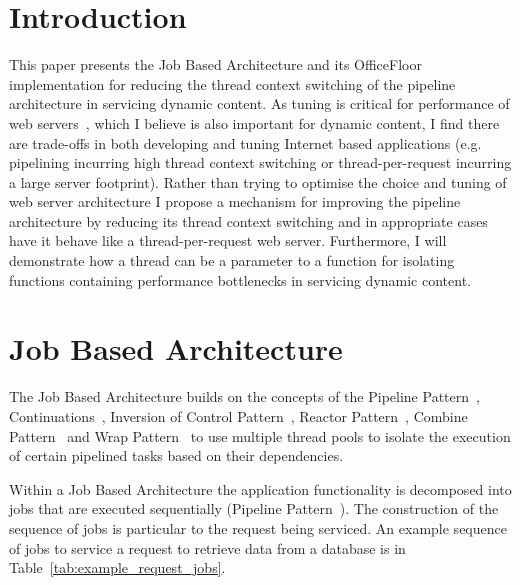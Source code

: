 \documentclass[conference]{ieee/IEEEtran}
\begin{document}
%
\IEEEpeerreviewmaketitle



\section{Introduction}
This paper presents the Job Based Architecture and its OfficeFloor
implementation for reducing the thread context switching of the pipeline
architecture in servicing dynamic content.  As tuning is critical for
performance of web servers~\cite{tuning-important,tuning-os-important}, which I
believe is also important for dynamic content, I find there are trade-offs in
both developing and tuning Internet based applications (e.g. pipelining
incurring high thread context switching or thread-per-request incurring a large
server footprint).  Rather than trying to optimise the choice and tuning of web
server architecture I propose a mechanism for improving the pipeline
architecture by reducing its thread context switching and in appropriate cases
have it behave like a thread-per-request web server.  Furthermore, I will
demonstrate how a thread can be a parameter to a function for isolating
functions containing performance bottlenecks in servicing dynamic content.


\section{Job Based Architecture}
The Job Based Architecture builds on the concepts of the Pipeline
Pattern~\cite{pipeline}, Continuations~\cite{continuations}, Inversion of
Control Pattern~\cite{ioc}, Reactor Pattern~\cite{reactor}, Combine
Pattern~\cite{pipeline} and Wrap Pattern~\cite{pipeline} to use multiple thread
pools to isolate the execution of certain pipelined tasks based on their
dependencies.

Within a Job Based Architecture the application functionality is decomposed into
jobs that are executed sequentially (Pipeline Pattern~\cite{pipeline}).  The
construction of the sequence of jobs is particular to the request being
serviced.  An example sequence of jobs to service a request to retrieve data
from a database is in Table~\ref{tab:example_request_jobs}.
\end{document}

